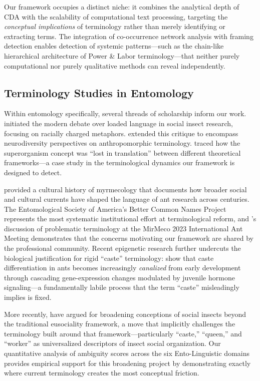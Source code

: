 \documentclass[
]{article}
\numberwithin{equation}{section}
\begin{document}
Our framework occupies a distinct niche: it combines the analytical
depth of CDA with the scalability of computational text processing,
targeting the \emph{conceptual implications} of terminology rather than
merely identifying or extracting terms. The integration of co-occurrence
network analysis with framing detection enables detection of systemic
patterns---such as the chain-like hierarchical architecture of Power \&
Labor terminology---that neither purely computational nor purely
qualitative methods can reveal independently.

\subsection{Terminology Studies in
Entomology}\label{terminology-studies-in-entomology}

Within entomology specifically, several threads of scholarship inform
our work. \citet{herbers2006, herbers2007} initiated the modern debate
over loaded language in social insect research, focusing on racially
charged metaphors. \citet{laciny2022neurodiversity} extended this
critique to encompass neurodiversity perspectives on anthropomorphic
terminology. \citet{boomsma2018superorganismality} traced how the
superorganism concept was ``lost in translation'' between different
theoretical frameworks---a case study in the terminological dynamics our
framework is designed to detect.

\citet{sleigh2007ants} provided a cultural history of myrmecology that
documents how broader social and cultural currents have shaped the
language of ant research across centuries. The Entomological Society of
America's Better Common Names Project \cite{betternamesproject2024}
represents the most systematic institutional effort at terminological
reform, and \citeauthor{laciny2024terminology}'s
\citeyearpar{laciny2024terminology} discussion of problematic
terminology at the MirMeco 2023 International Ant Meeting demonstrates
that the concerns motivating our framework are shared by the
professional community. Recent epigenetic research further undercuts the
biological justification for rigid ``caste'' terminology:
\citet{warner2024caste} show that caste differentiation in ants becomes
increasingly \emph{canalized} from early development through cascading
gene-expression changes modulated by juvenile hormone signaling---a
fundamentally labile process that the term ``caste'' misleadingly
implies is fixed.

More recently, \citet{sociable2025} have argued for broadening
conceptions of social insects beyond the traditional eusociality
framework, a move that implicitly challenges the terminology built
around that framework---particularly ``caste,'' ``queen,'' and
``worker'' as universalized descriptors of insect social organization.
Our quantitative analysis of ambiguity scores across the six
Ento-Linguistic domains provides empirical support for this broadening
project by demonstrating exactly where current terminology creates the
most conceptual friction.
\end{document}
